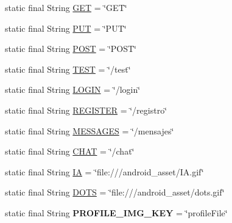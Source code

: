 \begin{DoxyCompactItemize}
\item 
static final String \hyperlink{classcom_1_1example_1_1sebastian_1_1tindertp_1_1commonTools_1_1Common_a8937fc1ac037355631286d3b45bb959b}{G\+ET} = \char`\"{}G\+ET\char`\"{}
\item 
static final String \hyperlink{classcom_1_1example_1_1sebastian_1_1tindertp_1_1commonTools_1_1Common_a034675c5513960eb228c8788a450612e}{P\+UT} = \char`\"{}P\+UT\char`\"{}
\item 
static final String \hyperlink{classcom_1_1example_1_1sebastian_1_1tindertp_1_1commonTools_1_1Common_aef1815c3b4427639e9ffdd99d36674be}{P\+O\+ST} = \char`\"{}P\+O\+ST\char`\"{}
\item 
static final String \hyperlink{classcom_1_1example_1_1sebastian_1_1tindertp_1_1commonTools_1_1Common_a2cf3afaf3a741d3286bafb5606c9aede}{T\+E\+ST} = \char`\"{}/test\char`\"{}
\item 
static final String \hyperlink{classcom_1_1example_1_1sebastian_1_1tindertp_1_1commonTools_1_1Common_ac3459941ff680be2f021432f775220b3}{L\+O\+G\+IN} = \char`\"{}/login\char`\"{}
\item 
static final String \hyperlink{classcom_1_1example_1_1sebastian_1_1tindertp_1_1commonTools_1_1Common_afb144b85f2295930ca07d403cc547f48}{R\+E\+G\+I\+S\+T\+ER} = \char`\"{}/registro\char`\"{}
\item 
static final String \hyperlink{classcom_1_1example_1_1sebastian_1_1tindertp_1_1commonTools_1_1Common_acada4b49a0d72e7c468fd64c3e7ed6eb}{M\+E\+S\+S\+A\+G\+ES} = \char`\"{}/mensajes\char`\"{}
\item 
static final String \hyperlink{classcom_1_1example_1_1sebastian_1_1tindertp_1_1commonTools_1_1Common_a22cdbc7c176add88325a44caaace5168}{C\+H\+AT} = \char`\"{}/chat\char`\"{}
\item 
static final String \hyperlink{classcom_1_1example_1_1sebastian_1_1tindertp_1_1commonTools_1_1Common_aae5ecea5aa3915aa216f04a10f1d6074}{IA} = \char`\"{}file\+:///android\+\_\+asset/I\+A.\+gif\char`\"{}
\item 
static final String \hyperlink{classcom_1_1example_1_1sebastian_1_1tindertp_1_1commonTools_1_1Common_af9ff2dd415fc9361e082cf3877c8c635}{D\+O\+TS} = \char`\"{}file\+:///android\+\_\+asset/dots.\+gif\char`\"{}
\item 
static final String {\bfseries P\+R\+O\+F\+I\+L\+E\+\_\+\+I\+M\+G\+\_\+\+K\+EY} = \char`\"{}profile\+File\char`\"{}\hypertarget{classcom_1_1example_1_1sebastian_1_1tindertp_1_1commonTools_1_1Common_a9e1c969f09ba9c7b331a6eede34b3ba7}{}\label{classcom_1_1example_1_1sebastian_1_1tindertp_1_1commonTools_1_1Common_a9e1c969f09ba9c7b331a6eede34b3ba7}


\end{DoxyCompactItemize}

